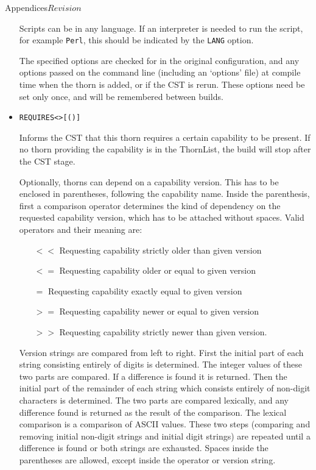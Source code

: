 \begin{cactuspart}{Appendices}{}{$Revision$}
\begin{itemize}
Scripts can be in any language.  If an interpreter is needed to run
the script, for example \verb|Perl|, this should be indicated by the
\verb|LANG| option.

The specified options are checked for in the original configuration,
and any options passed on the command line (including an `options'
file) at compile time when the thorn is added, or if the CST is
rerun.  These options need be set only once, and will be remembered
between builds.

\item

\begin{alltt}
REQUIRES  <> [( )]
\end{alltt}

Informs the CST that this thorn requires a certain capability to be
present.  If no thorn providing the capability is in the ThornList,
the build will stop after the CST stage.

Optionally, thorns can depend on a capability version. This has to be enclosed in
parentheses, following the capability name. Inside the parenthesis, first a comparison
operator determines the kind of dependency on the requested capability version, which
has to be attached without spaces. Valid operators and their meaning are:
\begin{itemize}
 \item[$<<$] Requesting capability strictly older than given version
 \item[$<=$] Requesting capability older or equal to given version
 \item[$=$]  Requesting capability exactly equal to given version
 \item[$>=$] Requesting capability newer or equal to given version
 \item[$>>$] Requesting capability strictly newer than given version.
\end{itemize}
Version strings are compared from left to right. First the initial part of each
string consisting entirely of digits is determined. The integer values of
these two parts are compared. If a difference is found it is returned. Then the
initial part of the remainder of each string which consists entirely of
non-digit characters is determined. The two parts are compared lexically, and
any difference found is returned as the result of the comparison. The lexical
comparison is a comparison of ASCII values. These two steps (comparing and
removing initial non-digit strings and initial digit strings) are repeated
until a difference is found or both strings are exhausted. Spaces inside the
parentheses are allowed, except inside the operator or version string.


\end{itemize}
\end{cactuspart}
